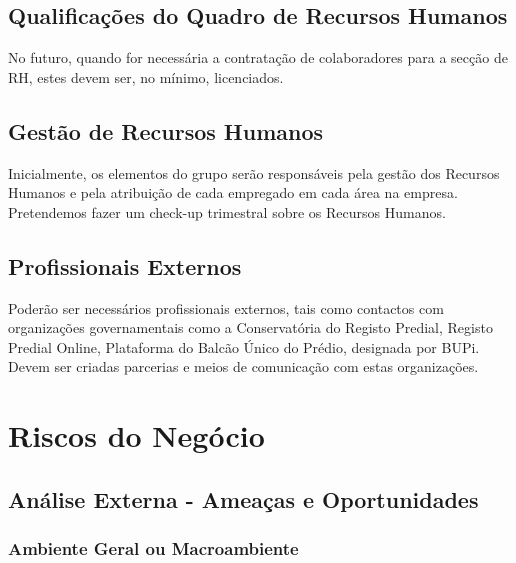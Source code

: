 \documentclass[11pt]{article}
\begin{document}
	
	\large
	\subsection{Qualificações do Quadro de Recursos Humanos}
	
	\normalsize
	
	No futuro, quando for necessária a contratação de colaboradores para a secção de RH, estes devem ser, no mínimo, licenciados.
	
	
	\large
	\subsection{Gestão de Recursos Humanos}
	
	\normalsize
	
	Inicialmente, os elementos do grupo serão responsáveis pela gestão dos Recursos Humanos e pela atribuição de cada empregado em cada área na empresa. Pretendemos fazer um check-up trimestral sobre os Recursos Humanos. 
	
	
	\large
	\subsection{Profissionais Externos}
	
	\normalsize
	
	Poderão ser necessários profissionais externos, tais como contactos com organizações governamentais como a Conservatória do Registo Predial, Registo Predial Online, Plataforma do Balcão Único
	do Prédio, designada por BUPi. Devem ser criadas parcerias e meios de comunicação com estas organizações.
	
	\pagebreak
	
	\large
	\section{Riscos do Negócio}
	\subsection{Análise Externa - Ameaças e Oportunidades}
	\subsubsection{Ambiente Geral ou Macroambiente}
	
	\footnotesize
	
\end{document}
